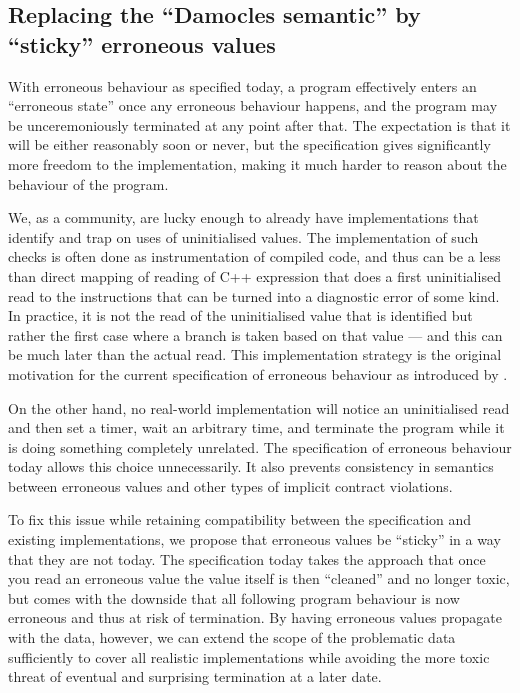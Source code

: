 \subsection{Replacing the ``Damocles semantic'' by ``sticky'' erroneous values}
\label{damocles}

With erroneous behaviour as specified today, a program effectively enters an ``erroneous state'' once any erroneous behaviour happens, and the program may be unceremoniously terminated at any point after that.  The expectation is that it will be either reasonably soon or never, but the specification gives significantly more freedom to the implementation, making it much harder to reason about the behaviour of the program.

We, as a community, are lucky enough to already have implementations that identify and trap on uses of uninitialised values.
 The implementation of such checks is often done as instrumentation of compiled code, and thus can be a less than direct mapping of reading of C++ expression that does a first uninitialised read to the instructions that can be turned into a diagnostic error of some kind.
In practice, it is not the read of the uninitialised value that is identified but rather the first case where a branch is taken based on that value --- and this can be much later than the actual read. This implementation strategy is the original motivation for the current specification of erroneous behaviour as introduced by \cite{P2795R5}.

On the other hand, no real-world implementation will notice an uninitialised read and then set a timer, wait an arbitrary time, and terminate the program while it is doing something completely unrelated.  The specification of erroneous behaviour today allows this choice unnecessarily. It also prevents consistency in semantics between erroneous values and other types of implicit contract violations.

To fix this issue while retaining compatibility between the specification and existing implementations, we propose that erroneous values be ``sticky'' in a way that they are not today.  The specification today takes the approach that once you read an erroneous value the value itself is then ``cleaned'' and no longer toxic, but comes with the downside that all following program behaviour is now erroneous and thus at risk of termination.    By having erroneous values propagate with the data, however, we can extend the scope of the problematic data sufficiently to cover all realistic implementations while avoiding the more toxic threat of eventual and surprising termination at a later date.

